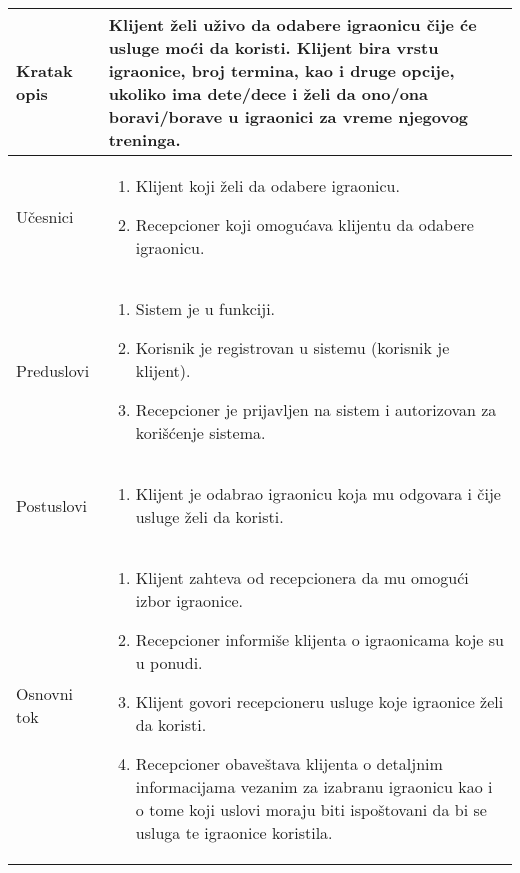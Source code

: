 \documentclass[../../main.tex]{subfiles}
\begin{document}
\begin{longtable}{| p{} | p{} |} 
\hline
    Kratak opis & Klijent želi uživo da odabere igraonicu čije će usluge moći da koristi. Klijent bira vrstu igraonice, broj termina, kao i druge opcije, ukoliko ima dete/dece i želi da ono/ona boravi/borave u igraonici za vreme njegovog treninga.  \\ 
\hline
    Učesnici &
    \begin{enumerate}
        \item Klijent koji želi da odabere igraonicu.
        \item Recepcioner koji omogućava klijentu da odabere igraonicu.
    \end{enumerate}\\
\hline
   Preduslovi &
    \begin{enumerate}
        \item Sistem je u funkciji.
        \item Korisnik je registrovan u sistemu (korisnik je klijent).
        \item Recepcioner je prijavljen na sistem i autorizovan za korišćenje sistema.
    \end{enumerate}\\
\hline  
    Postuslovi & 
    \begin{enumerate}
         \item Klijent je odabrao igraonicu koja mu odgovara i čije usluge želi da koristi.
    \end{enumerate} \\
\hline
    Osnovni tok & 
    \begin{enumerate}
        \item Klijent zahteva od recepcionera da mu omogući izbor igraonice.
        \item Recepcioner informiše klijenta o igraonicama koje su u ponudi.
        \item Klijent govori recepcioneru usluge koje igraonice želi da koristi.
        \item Recepcioner obaveštava klijenta o detaljnim informacijama vezanim za izabranu igraonicu kao i o tome koji uslovi moraju biti ispoštovani da bi se usluga te igraonice koristila.

\end{enumerate}
\end{longtable}
\end{document}
